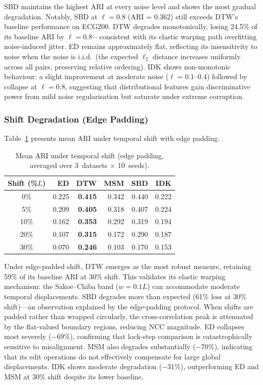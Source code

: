 SBD maintains the highest ARI at every noise level and shows the most gradual degradation.
Notably, SBD at $\ell = 0.8$ (ARI = 0.362) still exceeds DTW's baseline performance on ECG200.
DTW degrades monotonically, losing 24.5\% of its baseline ARI by $\ell = 0.8$---consistent with its elastic warping path overfitting noise-induced jitter.
ED remains approximately flat, reflecting its insensitivity to noise when the noise is i.i.d.\ (the expected $\ell_2$ distance increases uniformly across all pairs, preserving relative ordering).
IDK shows non-monotonic behaviour: a slight improvement at moderate noise ($\ell = 0.1$--$0.4$) followed by collapse at $\ell = 0.8$, suggesting that distributional features gain discriminative power from mild noise regularisation but saturate under extreme corruption.

\subsubsection{Shift Degradation (Edge Padding)}\label{sec:results-shift}

Table~\ref{tab:shift-ari} presents mean ARI under temporal shift with edge padding.

\begin{table}[htbp]
\centering
\caption{Mean ARI under temporal shift (edge padding, averaged over 3~datasets $\times$ 10~seeds).}\label{tab:shift-ari}
\small
\begin{tabular}{c r r r r r}
\toprule
Shift (\%$L$) & ED & DTW & MSM & SBD & IDK \\
\midrule
0\%  & 0.225 & \textbf{0.415} & 0.342 & 0.440 & 0.222 \\
5\%  & 0.209 & \textbf{0.405} & 0.318 & 0.407 & 0.224 \\
10\% & 0.162 & \textbf{0.353} & 0.292 & 0.319 & 0.194 \\
20\% & 0.107 & \textbf{0.315} & 0.172 & 0.290 & 0.187 \\
30\% & 0.070 & \textbf{0.246} & 0.103 & 0.170 & 0.153 \\
\bottomrule
\end{tabular}
\end{table}

Under edge-padded shift, DTW emerges as the most robust measure, retaining 59\% of its baseline ARI at 30\% shift.
This validates its elastic warping mechanism: the Sakoe--Chiba band ($w = 0.1L$) can accommodate moderate temporal displacements.
SBD degrades more than expected (61\% loss at 30\% shift)---an observation explained by the edge-padding protocol.
When shifts are padded rather than wrapped circularly, the cross-correlation peak is attenuated by the flat-valued boundary regions, reducing NCC magnitude.
ED collapses most severely ($-69\%$), confirming that lock-step comparison is catastrophically sensitive to misalignment.
MSM also degrades substantially ($-70\%$), indicating that its edit operations do not effectively compensate for large global displacements.
IDK shows moderate degradation ($-31\%$), outperforming ED and MSM at 30\% shift despite its lower baseline.

